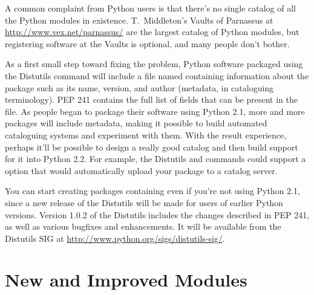\documentclass{howto}
\begin{document}
A common complaint from Python users is that there's no single catalog
of all the Python modules in existence.  T.~Middleton's Vaults of
Parnassus at \url{http://www.vex.net/parnassus/} are the largest
catalog of Python modules, but registering software at the Vaults is
optional, and many people don't bother.

As a first small step toward fixing the problem, Python software
packaged using the Distutils  command will include a
file named  containing information about the package
such as its name, version, and author (metadata, in cataloguing
terminology).  PEP 241 contains the full list of fields that can be
present in the  file.  As people began to package their
software using Python 2.1, more and more packages will include
metadata, making it possible to build automated cataloguing systems
and experiment with them.  With the result experience, perhaps it'll
be possible to design a really good catalog and then build support for
it into Python 2.2.  For example, the Distutils 
and  commands could support a  option
that would automatically upload your package to a catalog server. 

You can start creating packages containing  even if
you're not using Python 2.1, since a new release of the Distutils will
be made for users of earlier Python versions.  Version 1.0.2 of the
Distutils includes the changes described in PEP 241, as well as
various bugfixes and enhancements.  It will be available from 
the Distutils SIG at \url{http://www.python.org/sigs/distutils-sig/}.

\begin{seealso}



\end{seealso}

\section{New and Improved Modules}
\end{document}
